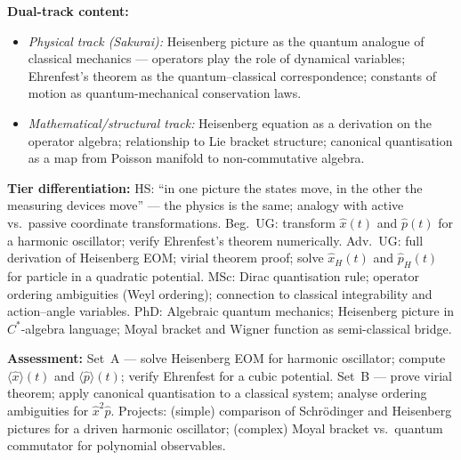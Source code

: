 \documentclass[11pt,a4paper]{article}
\begin{document}
\begin{tcolorbox}[modulebox, title={Module~I.3 / L07: Pictures of Quantum Mechanics and the Heisenberg Picture}]
\medskip\textbf{Dual-track content:}
\begin{itemize}[leftmargin=1.4em,topsep=2pt,itemsep=1pt]
  \item \textit{Physical track (Sakurai):} Heisenberg picture as the quantum analogue
    of classical mechanics --- operators play the role of dynamical variables;
    Ehrenfest's theorem as the quantum--classical correspondence;
    constants of motion as quantum-mechanical conservation laws.
  \item \textit{Mathematical/structural track:} Heisenberg equation as a derivation on the
    operator algebra; relationship to Lie bracket structure; canonical quantisation as
    a map from Poisson manifold to non-commutative algebra.
\end{itemize}

\medskip\textbf{Tier differentiation:}
HS: ``in one picture the states move, in the other the measuring devices move'' ---
the physics is the same; analogy with active vs.\ passive coordinate transformations.
Beg.\ UG: transform $\hat{x}(t)$ and $\hat{p}(t)$ for a harmonic oscillator;
verify Ehrenfest's theorem numerically.
Adv.\ UG: full derivation of Heisenberg EOM; virial theorem proof;
solve $\hat{x}_H(t)$ and $\hat{p}_H(t)$ for particle in a quadratic potential.
MSc: Dirac quantisation rule; operator ordering ambiguities (Weyl ordering);
connection to classical integrability and action--angle variables.
PhD: Algebraic quantum mechanics; Heisenberg picture in $C^*$-algebra language;
Moyal bracket and Wigner function as semi-classical bridge.

\medskip\textbf{Assessment:}
Set~A --- solve Heisenberg EOM for harmonic oscillator; compute $\langle\hat{x}\rangle(t)$
and $\langle\hat{p}\rangle(t)$; verify Ehrenfest for a cubic potential.
Set~B --- prove virial theorem; apply canonical quantisation to a classical system;
analyse ordering ambiguities for $\hat{x}^2\hat{p}$.
Projects: (simple) comparison of Schr\"odinger and Heisenberg pictures for a
driven harmonic oscillator; (complex) Moyal bracket vs.\ quantum commutator for
polynomial observables.
\end{tcolorbox}
\end{document}
